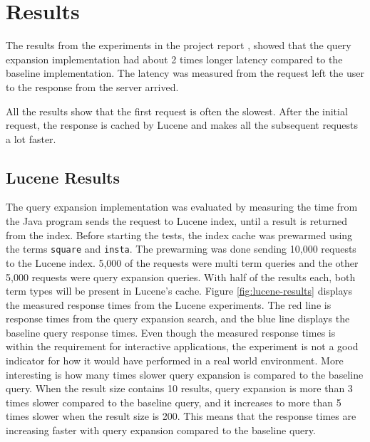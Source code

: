 \section{Results}
\label{sec:results}
The results from the experiments in the project report \cite{project-report},
showed that the query expansion implementation had about 2 times longer latency compared to the baseline implementation.
The latency was measured from the request left the user to the response from the server arrived.

All the results show that the first request is often the slowest.
After the initial request,
the response is cached by Lucene and makes all the subsequent requests a lot faster.

\subsection{Lucene Results}
The query expansion implementation was evaluated by measuring the time from the Java program sends the request to Lucene index,
until a result is returned from the index.
Before starting the tests, the index cache was prewarmed using the terms \texttt{square} and \texttt{insta}.
The prewarming was done sending 10,000 requests to the Lucene index.
5,000 of the requests were multi term queries and the other 5,000 requests were query expansion queries.
With half of the results each, both term types will be present in Lucene's cache.
Figure \ref{fig:lucene-results} displays the measured response times from the Lucene experiments.
The red line is response times from the query expansion search, and the blue line displays the baseline query response times.
Even though the measured response times is within the requirement for interactive applications,
the experiment is not a good indicator for how it would have performed in a real world environment.
More interesting is how many times slower query expansion is compared to the baseline query.
When the result size contains 10 results,
query expansion is more than 3 times slower compared to the baseline query,
and it increases to more than 5 times slower when the result size is 200.
This means that the response times are increasing faster with query expansion compared to the baseline query.

